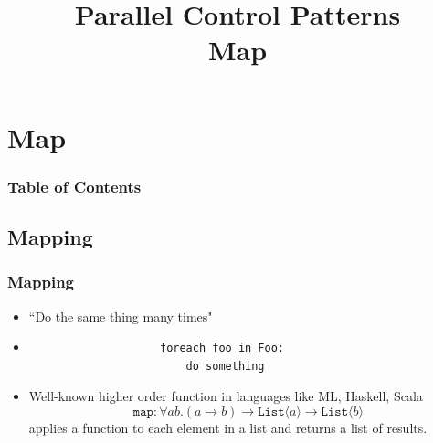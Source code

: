 \documentclass[xcolor=dvipsnames]{beamer}
\begin{document}
	\title[Map Pattern]{Parallel Control Patterns\\Map}
	\author[]{\className}
	\institute[\className]{\departmentName}
	\date{} 


	\begin{frame}
		\maketitle
	\end{frame}


\section{Map} 

	\begin{frame} \frametitle{Table of Contents}
		\tableofcontents[currentsection]
	\end{frame} 
	
	
	\subsection*{Mapping}
		\begin{frame}[fragile] \frametitle{Mapping}
			\begin{itemize}
					\item ``Do the same thing many times"
					\item \begin{verbatim}
					foreach foo in Foo:
					    do something
					\end{verbatim}
					\item Well-known higher order function in languages like ML, 
					Haskell, Scala
					\[ \texttt{map} : \forall a b. (a \to b) \to \texttt{List}\langle 
					a\rangle \to \texttt{List}\langle b\rangle \]
					applies a function to each element in a list and returns a list 
	                of results.\\
			\end{itemize}
		\end{frame}
			
\end{document}
